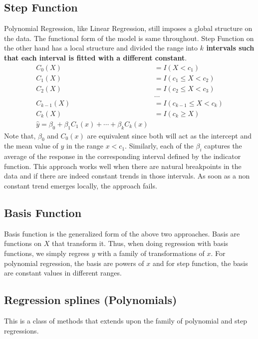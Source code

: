 \documentclass[11pt, a4paper]{article}
\begin{document}
    \subsection{Step Function}
    Polynomial Regression, like Linear Regression, still imposes a global structure on the data. The functional form of the model is same throughout. Step Function on the other hand has a local structure and divided the range into \textbf{$k$ intervals such that each interval is fitted with a different constant}.
    \begin{align*}
        C_{0}(X) &= I(X < c_{1})\\
        C_{1}(X) &= I(c_{1} \leq X < c_{2})\\
        C_{2}(X) &= I(c_{2} \leq X < c_{3})\\
        &\hdots\\
        C_{k-1}(X) &= I(c_{k-1} \leq X < c_{k})\\
        C_{k}(X) &= I(c_{k} \geq X)\\
        \hat{y} = \beta_{0} + \beta_{1}C_{1}(x) + \cdots + \beta_{k}C_{k}(x)
    \end{align*}
    Note that, $\beta_{0}$ and $C_{0}(x)$ are equivalent since both will act as the intercept and the mean value of $y$ in the range $x < c_{1}$. Similarly, each of the $\beta_{i}$ captures the average of the response in the corresponding interval defined by the indicator function.\newline
    This approach works well when there are natural breakpoints in the data and if there are indeed constant trends in those intervals. As soon as a non constant trend emerges locally, the approach fails.

    
    \subsection{Basis Function}
    Basis function is the generalized form of the above two approaches. Basis are functions on $X$ that transform it. Thus, when doing regression with basis functions, we simply regress $y$ with a family of transformations of $x$.\newline
    For polynomial regression, the basis are powers of $x$ and for step function, the basis are constant values in different ranges.

    
    \subsection{Regression splines (Polynomials)}
    This is a class of methods that extends upon the family of polynomial and step regressions.\newline
\end{document}
